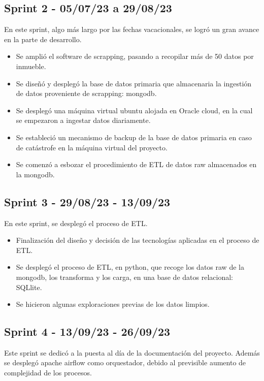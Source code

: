 \subsection{Sprint 2 - 05/07/23 a 29/08/23}

En este sprint, algo más largo por las fechas vacacionales, se logró un gran avance en la parte de desarrollo.

\begin{itemize}
    \item Se amplió el software de scrapping, pasando a recopilar más de 50 datos por inmueble.
    \item Se diseñó y desplegó la base de datos primaria que almacenaria la ingestión de datos proveniente de scrapping: mongodb.
    \item Se desplegó una máquina virtual ubuntu alojada en Oracle cloud, en la cual se empezaron a ingestar datos diariamente.
    \item Se estableció un mecanismo de backup de la base de datos primaria en caso de catástrofe en la máquina virtual del proyecto.
    \item Se comenzó a esbozar el procedimiento de ETL de datos raw almacenados en la mongodb.
\end{itemize}

\subsection{Sprint 3 - 29/08/23 - 13/09/23}

En este sprint, se desplegó el proceso de ETL.

\begin{itemize}
    \item Finalización del diseño y decisión de las tecnologías aplicadas en el proceso de ETL.
    \item Se desplegó el proceso de ETL, en python, que recoge los datos raw de la mongodb, los transforma y los carga, en una base de datos relacional: SQLlite.
    \item Se hicieron algunas exploraciones previas de los datos limpios.
\end{itemize}

\subsection{Sprint 4 -  13/09/23 - 26/09/23}

Este sprint se dedicó a la puesta al día de la documentación del proyecto. Además se desplegó apache airflow como orquestador, debido al previsible aumento de complejidad de los procesos.

